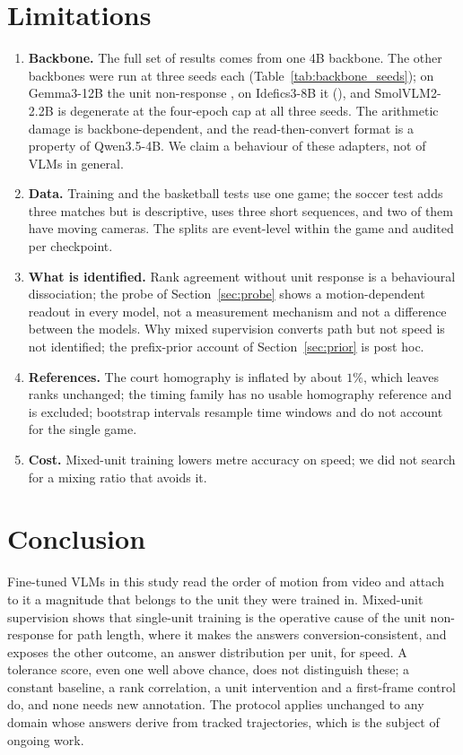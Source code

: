 \documentclass[preprint,number]{elsarticle}
\begin{document}
\section{Limitations}
\label{sec:limits}

\begin{enumerate}
\item \textbf{Backbone.} The full set of results comes from one 4B backbone.
  The other backbones were run at three seeds each (Table~\ref{tab:backbone_seeds});
  on Gemma3-12B the unit non-response
  , on Idefics3-8B it 
  (), and SmolVLM2-2.2B is degenerate at the
  four-epoch cap at all three seeds. The arithmetic
  damage is backbone-dependent, and the read-then-convert format is a property
  of Qwen3.5-4B. We claim a behaviour of these adapters, not of VLMs in
  general.
\item \textbf{Data.} Training and the basketball tests use one game; the soccer
  test adds three matches but is descriptive, uses three short sequences, and
  two of them have moving cameras. The splits are event-level within the game
  and audited per checkpoint.
\item \textbf{What is identified.} Rank agreement without unit response is a
  behavioural dissociation; the probe of Section~\ref{sec:probe} shows a
  motion-dependent readout in every model, not a measurement mechanism and
  not a difference between the models. Why mixed supervision
  converts path but not speed is not identified; the prefix-prior account of
  Section~\ref{sec:prior} is post hoc.
\item \textbf{References.} The court homography is inflated by about $1\%$,
  which leaves ranks unchanged; the timing family has no usable homography
  reference and is excluded; bootstrap intervals resample time windows and do
  not account for the single game.
\item \textbf{Cost.} Mixed-unit training lowers metre accuracy on speed; we did
  not search for a mixing ratio that avoids it.
\end{enumerate}

\section{Conclusion}

Fine-tuned VLMs in this study read the order of motion from video and attach to
it a magnitude that belongs to the unit they were trained in. Mixed-unit
supervision shows that single-unit training is the operative cause of the unit
non-response for path length, where it makes the answers
conversion-consistent, and exposes the other outcome, an answer distribution
per unit, for speed. A
tolerance score, even one well above chance, does not distinguish these; a
constant baseline, a rank correlation, a unit intervention and a first-frame
control do, and none needs new annotation. The protocol applies unchanged to
any domain whose answers derive from tracked trajectories, which is the
subject of ongoing work.
\end{document}
